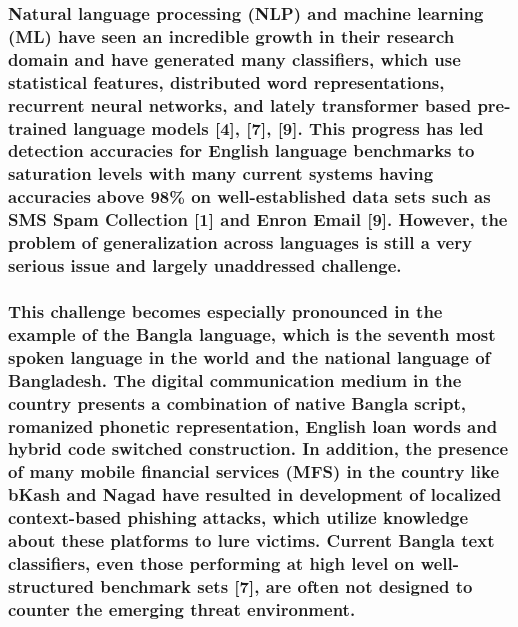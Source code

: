 \subsubsection{Natural language processing (NLP) and machine learning
(ML) have seen an incredible growth in their research domain and have
generated many classifiers, which use statistical features, distributed
word representations, recurrent neural networks, and lately transformer
based pre-trained language models {[}4{]}, {[}7{]}, {[}9{]}. This
progress has led detection accuracies for English language benchmarks to
saturation levels with many current systems having accuracies above 98\%
on well-established data sets such as SMS Spam Collection {[}1{]} and
Enron Email {[}9{]}. However, the problem of generalization across
languages is still a very serious issue and largely unaddressed
challenge.}\label{natural-language-processing-nlp-and-machine-learning-ml-have-seen-an-incredible-growth-in-their-research-domain-and-have-generated-many-classifiers-which-use-statistical-features-distributed-word-representations-recurrent-neural-networks-and-lately-transformer-based-pre-trained-language-models-4-7-9.-this-progress-has-led-detection-accuracies-for-english-language-benchmarks-to-saturation-levels-with-many-current-systems-having-accuracies-above-98-on-well-established-data-sets-such-as-sms-spam-collection-1-and-enron-email-9.-however-the-problem-of-generalization-across-languages-is-still-a-very-serious-issue-and-largely-unaddressed-challenge.}

\subsubsection{This challenge becomes especially pronounced in the
example of the Bangla language, which is the seventh most spoken
language in the world and the national language of Bangladesh. The
digital communication medium in the country presents a combination of
native Bangla script, romanized phonetic representation, English loan
words and hybrid code switched construction. In addition, the presence
of many mobile financial services (MFS) in the country like bKash and
Nagad have resulted in development of localized context-based phishing
attacks, which utilize knowledge about these platforms to lure victims.
Current Bangla text classifiers, even those performing at high level on
well-structured benchmark sets {[}7{]}, are often not designed to
counter the emerging threat
environment.}\label{this-challenge-becomes-especially-pronounced-in-the-example-of-the-bangla-language-which-is-the-seventh-most-spoken-language-in-the-world-and-the-national-language-of-bangladesh.-the-digital-communication-medium-in-the-country-presents-a-combination-of-native-bangla-script-romanized-phonetic-representation-english-loan-words-and-hybrid-code-switched-construction.-in-addition-the-presence-of-many-mobile-financial-services-mfs-in-the-country-like-bkash-and-nagad-have-resulted-in-development-of-localized-context-based-phishing-attacks-which-utilize-knowledge-about-these-platforms-to-lure-victims.-current-bangla-text-classifiers-even-those-performing-at-high-level-on-well-structured-benchmark-sets-7-are-often-not-designed-to-counter-the-emerging-threat-environment.}

